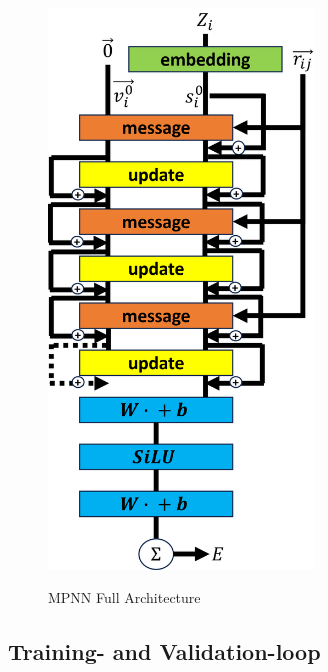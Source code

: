 \begin{figure}[H]
    \caption{MPNN Full Architecture}
    \centering\label{img:MPNN_arc}
    \includegraphics[width=200pt]{Images/Method/MPNN_arc.png}
\end{figure}

\subsection{Training- and Validation-loop}\label{subsec:training}

